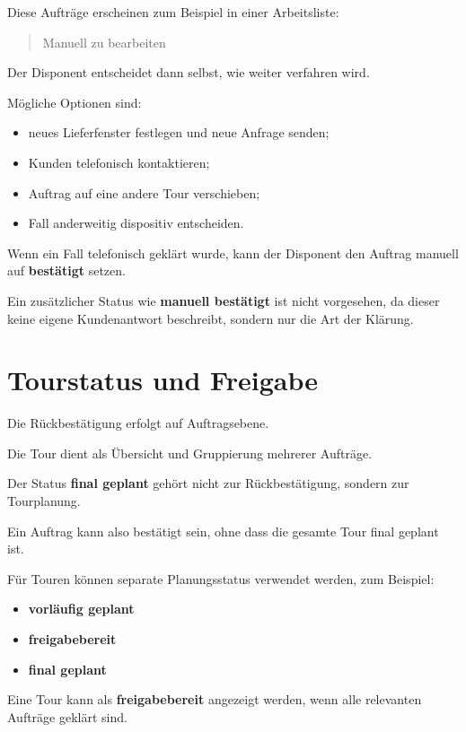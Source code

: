 \documentclass[12pt,a4paper]{article}
\begin{document}
	Diese Aufträge erscheinen zum Beispiel in einer Arbeitsliste:
	
	\begin{quote}
		Manuell zu bearbeiten
	\end{quote}
	
	Der Disponent entscheidet dann selbst, wie weiter verfahren wird.
	
	Mögliche Optionen sind:
	
	\begin{itemize}
		\item neues Lieferfenster festlegen und neue Anfrage senden;
		\item Kunden telefonisch kontaktieren;
		\item Auftrag auf eine andere Tour verschieben;
		\item Fall anderweitig dispositiv entscheiden.
	\end{itemize}
	
	Wenn ein Fall telefonisch geklärt wurde, kann der Disponent den Auftrag manuell auf \textbf{bestätigt} setzen.
	
	Ein zusätzlicher Status wie \textbf{manuell bestätigt} ist nicht vorgesehen, da dieser keine eigene Kundenantwort beschreibt, sondern nur die Art der Klärung.
	
	\section{Tourstatus und Freigabe}
	
	Die Rückbestätigung erfolgt auf Auftragsebene.
	
	Die Tour dient als Übersicht und Gruppierung mehrerer Aufträge.
	
	Der Status \textbf{final geplant} gehört nicht zur Rückbestätigung, sondern zur Tourplanung.
	
	Ein Auftrag kann also bestätigt sein, ohne dass die gesamte Tour final geplant ist.
	
	Für Touren können separate Planungsstatus verwendet werden, zum Beispiel:
	
	\begin{itemize}
		\item \textbf{vorläufig geplant}
		\item \textbf{freigabebereit}
		\item \textbf{final geplant}
	\end{itemize}
	
	Eine Tour kann als \textbf{freigabebereit} angezeigt werden, wenn alle relevanten Aufträge geklärt sind.
	
\end{document}
